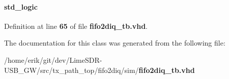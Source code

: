 \paragraph[{reset\+\_\+n}]{ {\bfseries \textcolor{comment}{std\+\_\+logic}\textcolor{vhdlchar}{ }} \hspace{0.3cm}{\ttfamily [Signal]}}\label{classfifo2diq__tb_1_1tb__behave_a1f070fd63a3a7fa45c907335ea870c5b}


Definition at line {\bf 65} of file {\bf fifo2diq\+\_\+tb.\+vhd}.



The documentation for this class was generated from the following file\+:\begin{DoxyCompactItemize}
\item 
/home/erik/git/dev/\+Lime\+S\+D\+R-\/\+U\+S\+B\+\_\+\+G\+W/src/tx\+\_\+path\+\_\+top/fifo2diq/sim/{\bf fifo2diq\+\_\+tb.\+vhd}\end{DoxyCompactItemize}
